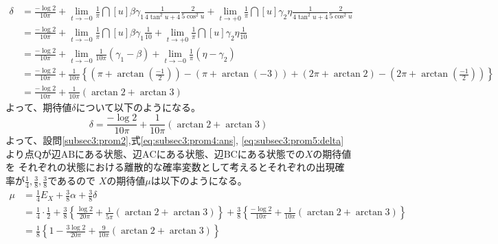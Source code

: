 \begin{enumerate}[(1)]
    \begin{align*}
        \delta 
        &= \frac{-\log 2}{10\pi} + \lim_{t \to -0}\frac{1}{\pi}\dint[u]{\beta}{\gamma_1}{\frac{1}{4\tan^{2}u + 4}\frac{2}{5\cos^{2}u}}
         + \lim_{t \to +0}\frac{1}{\pi}\dint[u]{\gamma_2}{\eta}{\frac{1}{4\tan^{2}u + 4}\frac{2}{5\cos^{2}u}}\\
        &= \frac{-\log 2}{10\pi} + \lim_{t \to -0}\frac{1}{\pi}\dint[u]{\beta}{\gamma_1}{\frac{1}{10}} 
         + \lim_{t \to +0}\frac{1}{\pi}\dint[u]{\gamma_2}{\eta}{\frac{1}{10}}\\
        &= \frac{-\log 2}{10\pi} + \lim_{t \to -0}\frac{1}{10\pi}(\gamma_1 - \beta) + \lim_{t \to -0}\frac{1}{\pi}(\eta - \gamma_2)\\
        &= \frac{-\log 2}{10\pi} + \frac{1}{10\pi}\left\{\left(\pi + \arctan\left(\frac{-1}{2}\right)\right) - (\pi + \arctan(-3))
        + (2\pi + \arctan 2) - \left(2\pi + \arctan\left(\frac{-1}{2}\right)\right)\right\}\\
        &= \frac{-\log 2}{10\pi} + \frac{1}{10\pi}(\arctan 2 + \arctan 3)
    \end{align*}
    よって、期待値$\delta$について以下のようになる。
    \begin{equation}
        \delta = \frac{-\log 2}{10\pi} + \frac{1}{10\pi}(\arctan 2 + \arctan 3)\label{eq:subsec3:prom5:delta}
    \end{equation}
    よって、設問\eqref{subsec3:prom2},式\eqref{eq:subsec3:prom4:ans}, \eqref{eq:subsec3:prom5:delta}
    より点$\mathrm{Q}$が辺$\mathrm{AB}$にある状態、辺$\mathrm{AC}$にある状態、辺$\mathrm{BC}$にある状態での$X$の期待値を
    それぞれの状態における離散的な確率変数として考えるとそれぞれの出現確率が$\frac{1}{4}, \frac{3}{8}, \frac{3}{8}$であるので
    $X$の期待値$\mu$は以下のようになる。
    \begin{align*}
        \mu &= \frac{1}{4}E_{X} + \frac{3}{8}\alpha + \frac{3}{8}\delta\\
        &= \frac{1}{4}\cdot\frac{1}{2} 
        + \frac{3}{8}\left\{\frac{\log 2}{20\pi} + \frac{1}{5\pi}(\arctan 2 + \arctan 3)\right\}
        + \frac{3}{8}\left\{\frac{-\log 2}{10\pi} + \frac{1}{10\pi}(\arctan 2 + \arctan 3)\right\}\\
        &= \frac{1}{8}\left\{1 - \frac{3\log 2}{20\pi} + \frac{9}{10\pi}(\arctan 2 + \arctan 3)\right\}
    \end{align*}
\end{enumerate}